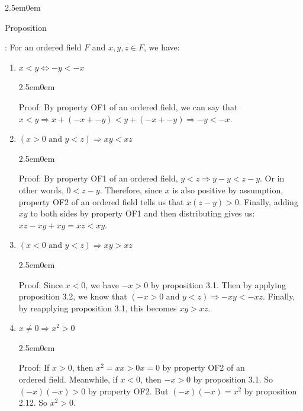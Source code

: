\documentclass{book}
\newcommand{\hTwo}{%
   \color{MidnightBlue}%
   \fontsize{13}{15}\selectfont%
}
\newcommand{\hThree}{%
   \color{PineGreen}
   \fontsize{13}{15}\selectfont%
}
\newenvironment{myIndent}{%
   \begin{adjustwidth}{2.5em}{0em}%
}{%
   \end{adjustwidth}%
}
\newcommand{\retTwo}{\hfill\bigbreak}
\newcounter{PropNumber}
\newcommand{\propCount}[1][1]{%
   \addtocounter{PropNumber}{#1}%
   \thePropNumber%
}
\begin{document}
   {\begin{myIndent} \hTwo
   Proposition \propCount: For an ordered field $F$ and 
      $x, y, z \in F$, we have:

      \begin{enumerate}
         \item $x<y \Leftrightarrow {-y}<{-x}$
         {\begin{myIndent} \hThree
            Proof: By property OF1 of an ordered field, we can
            say that\\ $x<y\Rightarrow x+({-x}+{-y})<y+({-x}+{-y})
            \Rightarrow -y < -x$. \retTwo
         \end{myIndent}}

         \item $(x>0 \text{ and } y<z) \Rightarrow xy<xz$
         {\begin{myIndent} \hThree
            Proof: By property OF1 of an ordered field, $y<z
            \Rightarrow y-y<z-y$. Or in other words, $0<z-y$.  
            Therefore, since $x$ is also positive by assumption,
            property OF2 of an ordered field tells us that
            $x(z-y)>0$. Finally, adding $xy$ to both sides by property
            OF1 and then distributing gives us: \\$xz-xy+xy=xz<xy$.
            \retTwo
         \end{myIndent}}

         \item $(x<0 \text{ and } y<z) \Rightarrow xy>xz$
         {\begin{myIndent} \hThree
            Proof: Since $x<0$, we have $-x>0$ by proposition 3.1.
            Then by applying proposition 3.2, we know that
            $(-x>0 \text{ and } y<z) \Rightarrow -xy<-xz$.
            Finally, by reapplying proposition 3.1, this becomes
            $xy>xz$.\retTwo
         \end{myIndent}}

         \item $x \neq 0 \Rightarrow x^2 > 0$
         {\begin{myIndent} \hThree
            Proof: If $x>0$, then $x^2=xx>0x=0$ by property OF2
            of an \\ordered field. Meanwhile, if $x<0$, then $-x>0$
            by proposition 3.1. So $(-x)(-x)>0$ by property OF2.
            But $(-x)(-x)=x^2$ by proposition 2.12. So $x^2>0$.
            \retTwo
         \end{myIndent}}
         \newpage


\end{enumerate}
\end{myIndent}}
\end{document}
